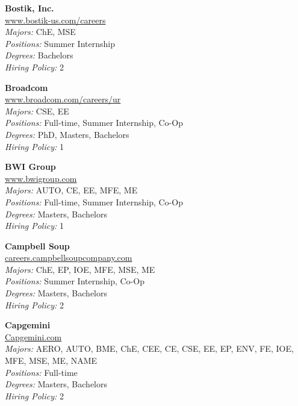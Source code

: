 \documentclass{article}
\begin{document}
\begin{center}
\begin{multicols}{3}
\begin{minipage}{.9\columnwidth}{\Large\bf Bostik, Inc. }\\
	\url{www.bostik-us.com/careers}\\
	\emph{Majors:} ChE, MSE\\
	\emph{Positions:} Summer Internship\\
	\emph{Degrees:} Bachelors\\
	\emph{Hiring Policy:} 2\\
\end{minipage}
 
\begin{minipage}{.9\columnwidth}{\Large\bf Broadcom }\\
	\url{www.broadcom.com/careers/ur}\\
	\emph{Majors:} CSE, EE\\
	\emph{Positions:} Full-time, Summer Internship, Co-Op\\
	\emph{Degrees:} PhD, Masters, Bachelors\\
	\emph{Hiring Policy:} 1\\
\end{minipage}
 
\begin{minipage}{.9\columnwidth}{\Large\bf BWI Group }\\
	\url{www.bwigroup.com}\\
	\emph{Majors:} AUTO, CE, EE, MFE, ME\\
	\emph{Positions:} Full-time, Summer Internship, Co-Op\\
	\emph{Degrees:} Masters, Bachelors\\
	\emph{Hiring Policy:} 1\\
\end{minipage}
 
\begin{minipage}{.9\columnwidth}{\Large\bf Campbell Soup }\\
	\url{careers.campbellsoupcompany.com}\\
	\emph{Majors:} ChE, EP, IOE, MFE, MSE, ME\\
	\emph{Positions:} Summer Internship, Co-Op\\
	\emph{Degrees:} Masters, Bachelors\\
	\emph{Hiring Policy:} 2\\
\end{minipage}
 
\begin{minipage}{.9\columnwidth}{\Large\bf Capgemini }\\
	\url{Capgemini.com}\\
	\emph{Majors:} AERO, AUTO, BME, ChE, CEE, CE, CSE, EE, EP, ENV, FE, IOE, MFE, MSE, ME, NAME\\
	\emph{Positions:} Full-time\\
	\emph{Degrees:} Masters, Bachelors\\
	\emph{Hiring Policy:} 2\\
\end{minipage}
 

\end{multicols}
\end{center}
\end{document}
